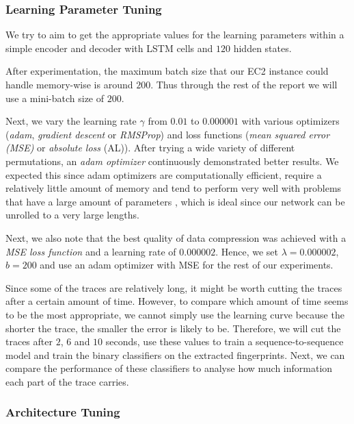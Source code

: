 \subsubsection{Learning Parameter Tuning}

We try to aim to get the appropriate values for the learning parameters within a simple encoder and decoder with LSTM cells and $120$ hidden states.

After experimentation, the maximum batch size that our EC2 instance could handle memory-wise is around $200$.
Thus through the rest of the report we will use a mini-batch size of $200$.

Next, we vary the learning rate $\gamma$ from $0.01$ to $0.000001$ with various optimizers (\textit{adam}, \textit{gradient descent} or \textit{RMSProp}) and loss functions (\textit{mean squared error (MSE)} or \textit{absolute loss} (AL)).
After trying a wide variety of different permutations, an \textit{adam optimizer} continuously demonstrated better results.
We expected this since adam optimizers are computationally efficient, require a relatively little amount of memory and tend to perform very well with problems that have a large amount of parameters \cite{kingma2014adam},
which is ideal since our network can be unrolled to a very large lengths.

Next, we also note that the best quality of data compression was achieved with a \textit{MSE loss function} and a learning rate of $0.000002$.
Hence, we set $\lambda = 0.000002$, $b = 200$ and use an adam optimizer with MSE for the rest of our experiments.

Since some of the traces are relatively long, it might be worth cutting the traces after a certain amount of time.
However, to compare which amount of time seems to be the most appropriate, we cannot simply use the learning curve because the shorter the trace, the smaller the error is likely to be.
Therefore, we will cut the traces after $2$, $6$ and $10$ seconds, use these values to train a sequence-to-sequence model and train the binary classifiers on the extracted fingerprints.
Next, we can compare the performance of these classifiers to analyse how much information each part of the trace carries.



\subsubsection{Architecture Tuning}

